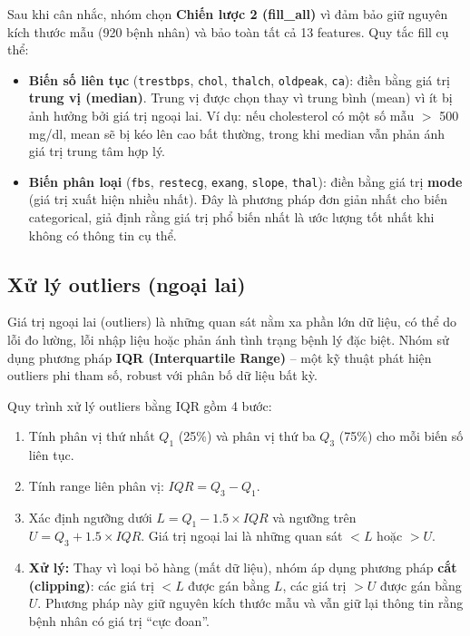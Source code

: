 Sau khi cân nhắc, nhóm chọn \textbf{Chiến lược 2 (fill\_all)} vì đảm bảo giữ nguyên kích thước mẫu (920 bệnh nhân) và bảo toàn tất cả 13 features. Quy tắc fill cụ thể:
\begin{itemize}
    \item \textbf{Biến số liên tục} (\texttt{trestbps}, \texttt{chol}, \texttt{thalch}, \texttt{oldpeak}, \texttt{ca}): điền bằng giá trị \textbf{trung vị (median)}. Trung vị được chọn thay vì trung bình (mean) vì ít bị ảnh hưởng bởi giá trị ngoại lai. Ví dụ: nếu cholesterol có một số mẫu $>$ 500 mg/dl, mean sẽ bị kéo lên cao bất thường, trong khi median vẫn phản ánh giá trị trung tâm hợp lý.
    \item \textbf{Biến phân loại} (\texttt{fbs}, \texttt{restecg}, \texttt{exang}, \texttt{slope}, \texttt{thal}): điền bằng giá trị \textbf{mode} (giá trị xuất hiện nhiều nhất). Đây là phương pháp đơn giản nhất cho biến categorical, giả định rằng giá trị phổ biến nhất là ước lượng tốt nhất khi không có thông tin cụ thể.
\end{itemize}

\subsection{Xử lý outliers (ngoại lai)}

Giá trị ngoại lai (outliers) là những quan sát nằm xa phần lớn dữ liệu, có thể do lỗi đo lường, lỗi nhập liệu hoặc phản ánh tình trạng bệnh lý đặc biệt. Nhóm sử dụng phương pháp \textbf{IQR (Interquartile Range)} -- một kỹ thuật phát hiện outliers phi tham số, robust với phân bố dữ liệu bất kỳ.

Quy trình xử lý outliers bằng IQR gồm 4 bước:
\begin{enumerate}
    \item Tính phân vị thứ nhất $Q_1$ (25\%) và phân vị thứ ba $Q_3$ (75\%) cho mỗi biến số liên tục.
    \item Tính range liên phân vị: $IQR = Q_3 - Q_1$.
    \item Xác định ngưỡng dưới $L = Q_1 - 1.5 \times IQR$ và ngưỡng trên $U = Q_3 + 1.5 \times IQR$. Giá trị ngoại lai là những quan sát $< L$ hoặc $> U$.
    \item \textbf{Xử lý:} Thay vì loại bỏ hàng (mất dữ liệu), nhóm áp dụng phương pháp \textbf{cắt (clipping)}: các giá trị $< L$ được gán bằng $L$, các giá trị $> U$ được gán bằng $U$. Phương pháp này giữ nguyên kích thước mẫu và vẫn giữ lại thông tin rằng bệnh nhân có giá trị ``cực đoan''.
\end{enumerate}

